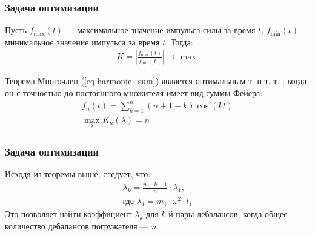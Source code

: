 \documentclass[10pt, pdf, hyperref={unicode}]{beamer}
\begin{document}
    \begin{frame}
        \frametitle{Задача оптимизации}
        \begin{center}
            \begin{minipage}[h]{0.97\linewidth}
                Пусть $f_{\max}(t)$ --- максимальное значение импульса силы за время $t$, $f_{\min}(t)$ --- минимальное значение импульса за время $t$. Тогда:
                \begin{equation}
                    \begin{gathered}
                        K = \left| \frac{f_{\max}(t)}{f_{\min}(t)} \right| \rightarrow \max
                    \end{gathered}
                \end{equation}
                \begin{block}{Теорема\footnotemark[3]}\label{teorema}
                    Многочлен (\ref{eq:harmonic_sum}) является оптимальным т. и т. т. , когда он с точностью до постоянного множителя имеет вид суммы Фейера:
                    \begin{equation}\label{eq:feer}
                        \begin{gathered}
                            f_n(t) = \sum\limits_{k = 1}^n (n + 1 - k) \cos(kt)\\
                            \max \limits_{\lambda} K_n(\lambda) = n
                        \end{gathered}
                    \end{equation}
                \end{block}
            \end{minipage}
        \end{center}
    \end{frame}

    \begin{frame}
        \frametitle{Задача оптимизации}
        \begin{center}
            \begin{minipage}[h]{0.97\linewidth}
                Исходя из теоремы выше, следует, что:
                \begin{equation}
                    \begin{gathered}
                        \lambda_k = \frac{n - k + 1}{n} \cdot \lambda_1,\\
                        \textrm{где } \lambda_1 = m_1 \cdot \omega_{1}^{2} \cdot l_1
                    \end{gathered}
                \end{equation}
                Это позволяет найти коэффициент $\lambda_k$ для $k$-й пары дебалансов, когда общее количество дебалансов погружателя --- $n$.
            \end{minipage}
        \end{center}
    \end{frame}
\end{document}
